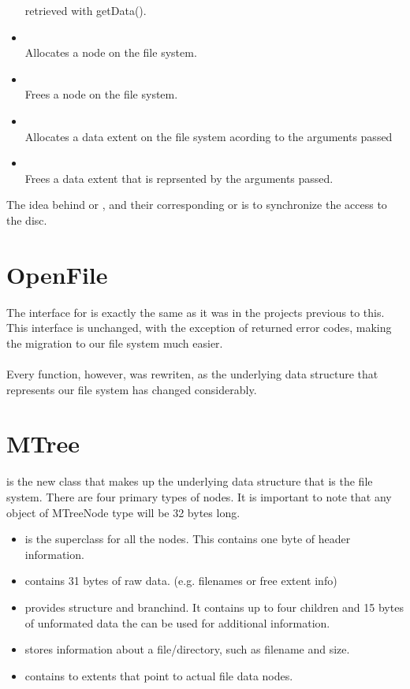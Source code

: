 \begin{itemize}
	retrieved with getData().
      \item		{}\\
	Allocates a node on the file system.
      \item		{}\\
	Frees a node on the file system.
      \item		{}\\
	Allocates a data extent on the file system acording to the arguments
	passed
      \item		{}\\
	Frees a data extent that is reprsented by the arguments passed.
  \end{itemize}

  The idea behind  or , and their corresponding
   or  is to synchronize the access
  to the disc.

\section{OpenFile}
\label{xref:openfileFS}
  The interface for  is exactly the same as it was in the 
  projects previous to this.  This interface is unchanged, with the exception
  of returned error codes, making the migration to our file system much easier.
  \\\\
  Every function, however, was rewriten, as the underlying 
  data structure that represents our file system has changed considerably.

\section{MTree}
\label{xref:mtreeFS}
   is the new class that makes up the underlying data structure
  that is the file system.  There are four primary types of nodes.  It is
  important to note that any object of MTreeNode type will be 32 bytes long.
  \begin{itemize}
    \item	{} is the superclass for all the nodes.  This
		contains one byte of header information.
    \item	{} contains 31 bytes of raw data.
		(e.g. filenames or free extent info)
    \item	{} provides structure and 
		branchind. It contains up to four children and
		15 bytes of unformated data the can be used for additional
		information.
    \item	{} stores information about a file/directory, such
		as filename and size.
    \item	{} contains to extents that point to actual
		file data nodes.
  \end{itemize}

